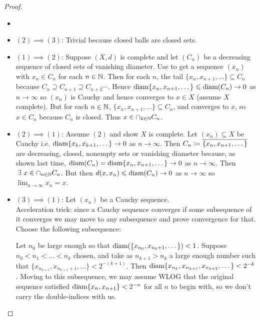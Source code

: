 \documentclass[14pt,oneside]{extarticle}
\begin{document}
\begin{proof}
\begin{itemize}[label=]
  \item
  \item $(2) \implies (3)$: Trivial because closed balls are closed sets.
  \item $(1) \implies (2)$: Suppose $(X,d)$ is complete and let $(C_n)$ be a decreasing sequence of closed sets of vanishing diameter. Use \AC{} to get a sequence $(x_n)$ with $x_n \in C_n$ for each $n \in \mathbb{N}$. Then for each $n$, the tail $\{x_n, x_{n+1}, \dots\} \subseteq C_n$ because $C_n \supseteq C_{n+1} \supseteq C_{n+2} \cdots$. Hence $\text{diam}{\{x_n,x_{n+1}, \dots \}} \leqslant \text{diam}{(C_n)} \to 0$ as $n \to \infty$ so $(x_n)$ is Cauchy and hence converges to $x \in X$ (assume $X$ complete). But for each $n \in \mathbb{N}$, $\{x_n, x_{n+1}, \dots\} \subseteq C_n$, and converges to $x$, so $x \in C_n$ because $C_n$ is closed. Thus $x \in \cap_{k \in \mathbb{N}}C_n$. \pic
  \item $(2) \implies (1)$: Assume $(2)$ and show $X$ is complete. Let $(x_n) \subseteq X$ be Cauchy i.e. $\text{diam}{\{x_k, x_{k+1}, \dots\}} \to 0$ as $n \to \infty$. Then $C_n \coloneqq \overline{\{x_n, x_{n+1}, \dots\}}$ are decreasing, closed, nonempty sets or vanishing diameter because, as shown last time, $\text{diam}{(C_n)} = \text{diam}{\{x_n, x_{n+1}, \dots\}} \to 0$ as $n \to \infty$. Then $\exists \, x \in \cap_{n \in \N} C_n$. But then $d(x,x_n) \leqslant \text{diam}{(C_n)} \to 0$ as $n \to \infty$ so $\lim_{n \to \infty} x_n=x$.
  \item $(3) \implies (1)$: Let $(x_n)$ be a Cauchy sequence. \\ \textcolor{solarized-magenta}{Acceleration trick:} since a Cauchy sequence converges if some subsequence of it converges we may move to any subsequence and prove convergence for that. Choose the following subsequence:
  
  Let $n_0$ be large enough so that $\text{diam}(\{x_{n_0}, x_{n_0 + 1}, \dots\}) < 1$. Suppose $n_0 < n_1 <\dots <n_k$ chosen, and take as $n_{k+1} > n_k$ a large enough number such that $\{x_{n_{k+1}}, x_{n_{k+1} + 1}, \dots\} < 2^{-(k+1)}$. Then $\text{diam}{\{x_{n_k}, x_{n_{k+1}}, x_{n_{k+2}}}, \dots\} < 2^{-k}$. Moving to this subsequence, we may assume WLOG that the original sequence satisfied $\text{diam}{\{x_n, x_{n+1}\}} < 2^{-n}$ for all $n$ to begin with, so we don't carry the double-indices with us.
    

\end{itemize}
\end{proof}
\end{document}
